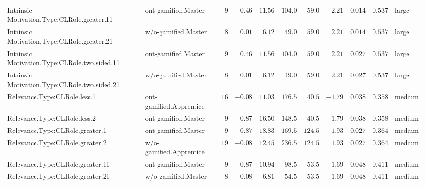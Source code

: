 \documentclass[6pt,a4paper]{article}
\begin{document}
\begin{landscape}
{\begin{longtable}{llrrrrrrrrl}
Intrinsic Motivation.Type:CLRole.greater.11&ont-gamified.Master&$ 9$&$ 0.46$&$11.56$&$104.0$&$ 59.0$&$ 2.21$&$0.014$&$0.537$&large\tabularnewline
Intrinsic Motivation.Type:CLRole.greater.21&w/o-gamified.Master&$ 8$&$ 0.01$&$ 6.12$&$ 49.0$&$ 59.0$&$ 2.21$&$0.014$&$0.537$&large\tabularnewline
Intrinsic Motivation.Type:CLRole.two.sided.11&ont-gamified.Master&$ 9$&$ 0.46$&$11.56$&$104.0$&$ 59.0$&$ 2.21$&$0.027$&$0.537$&large\tabularnewline
Intrinsic Motivation.Type:CLRole.two.sided.21&w/o-gamified.Master&$ 8$&$ 0.01$&$ 6.12$&$ 49.0$&$ 59.0$&$ 2.21$&$0.027$&$0.537$&large\tabularnewline
Relevance.Type:CLRole.less.1&ont-gamified.Apprentice&$16$&$-0.08$&$11.03$&$176.5$&$ 40.5$&$-1.79$&$0.038$&$0.358$&medium\tabularnewline
Relevance.Type:CLRole.less.2&ont-gamified.Master&$ 9$&$ 0.87$&$16.50$&$148.5$&$ 40.5$&$-1.79$&$0.038$&$0.358$&medium\tabularnewline
Relevance.Type:CLRole.greater.1&ont-gamified.Master&$ 9$&$ 0.87$&$18.83$&$169.5$&$124.5$&$ 1.93$&$0.027$&$0.364$&medium\tabularnewline
Relevance.Type:CLRole.greater.2&w/o-gamified.Apprentice&$19$&$-0.08$&$12.45$&$236.5$&$124.5$&$ 1.93$&$0.027$&$0.364$&medium\tabularnewline
Relevance.Type:CLRole.greater.11&ont-gamified.Master&$ 9$&$ 0.87$&$10.94$&$ 98.5$&$ 53.5$&$ 1.69$&$0.048$&$0.411$&medium\tabularnewline
Relevance.Type:CLRole.greater.21&w/o-gamified.Master&$ 8$&$-0.08$&$ 6.81$&$ 54.5$&$ 53.5$&$ 1.69$&$0.048$&$0.411$&medium\tabularnewline
\hline
\end{longtable}}

\end{landscape}
\end{document}
